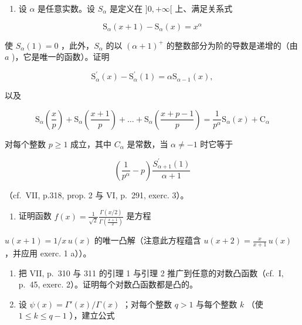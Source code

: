 \begin{enumerate}
\def\labelenumi{\alph{enumi})}
\setcounter{enumi}{1}
\tightlist
\item
  设 \(\alpha\) 是任意实数。设 \(S_{\alpha}\) 是定义在 \(]0, +\infty[\) 上、满足关系式
\end{enumerate}

\[
\mathrm{S} _ {\alpha} (x + 1) - \mathrm{S} _ {\alpha} (x) = x ^ {\alpha}
\]

使 \(S_{\alpha}(1) = 0\) ，此外，\(S_{\alpha}\) 的以 \((\alpha + 1)^{+}\) 的整数部分为阶的导数是递增的（由 \(a\) )，它是唯一的函数）。证明

\[
\mathrm{S} _ {\alpha} ^ {\prime} (x) - \mathrm{S} _ {\alpha} ^ {\prime} (1) = \alpha \mathrm{S} _ {\alpha - 1} (x),
\]

以及

\[
\mathrm{S} _ {\alpha} \left(\frac {x}{p}\right) + \mathrm{S} _ {\alpha} \left(\frac {x + 1}{p}\right) + \dots + \mathrm{S} _ {\alpha} \left(\frac {x + p - 1}{p}\right) = \frac {1}{p ^ {\alpha}} \mathrm{S} _ {\alpha} (x) + \mathrm{C} _ {\alpha}
\]

对每个整数 \(p \geqslant 1\) 成立，其中 \(C_{\alpha}\) 是常数，当 \(\alpha \neq -1\) 时它等于

\[
\left(\frac {1}{p ^ {\alpha}} - p\right) \frac {S _ {\alpha + 1} ^ {\prime} (1)}{\alpha + 1}
\]

（cf.~VII, p.318, prop. 2 与 VI, p.~291, exerc. 3）。

\begin{enumerate}
\def\labelenumi{\arabic{enumi})}
\setcounter{enumi}{3}
\tightlist
\item
  证明函数 \(f(x) = \frac{1}{\sqrt{2}}\frac{\Gamma(x / 2)}{\Gamma\left(\frac{x + 1}{2}\right)}\) 是方程
\end{enumerate}

\(u(x + 1) = 1 / x \, u(x)\) 的唯一凸解（注意此方程蕴含 \(u(x + 2) = \frac{x}{x + 1} \, u(x)\) ，并应用 exerc. 1 a））。

\begin{enumerate}
\def\labelenumi{\arabic{enumi})}
\setcounter{enumi}{4}
\item
  把 VII, p.~310 与 311 的引理 1 与引理 2 推广到任意的对数凸函数（cf.~I, p.~45, exerc. 2）。证明每个对数凸函数都是凸的。
\item
  设 \(\psi(x) = \Gamma'(x)/\Gamma(x)\) ；对每个整数 \(q > 1\) 与每个整数 \(k\) （使 \(1 \leqslant k \leqslant q - 1\) ），建立公式
\end{enumerate}

